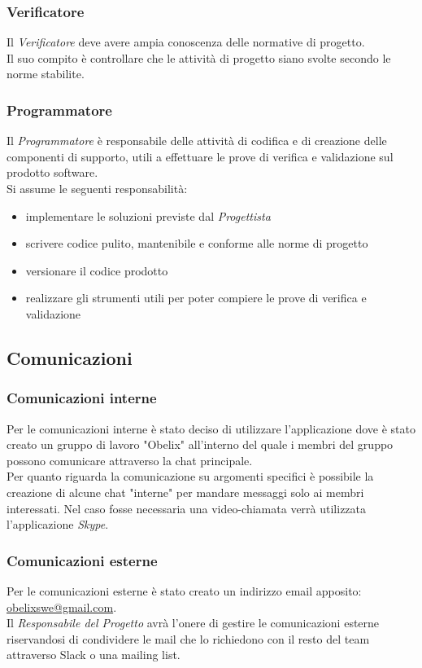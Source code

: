 \subsubsection{Verificatore}
Il  \emph{Verificatore}  deve avere ampia conoscenza delle normative di progetto.\\Il suo compito è controllare che le attività di progetto siano svolte secondo le norme stabilite.
\subsubsection{Programmatore}
Il  \emph{Programmatore}  è responsabile delle attività di codifica e di creazione delle componenti di supporto, utili a effettuare le prove di verifica e validazione sul prodotto software.\\
Si assume le seguenti responsabilità:
\begin{itemize}
	\item implementare le soluzioni previste dal  \emph{Progettista} 
	\item scrivere codice pulito, mantenibile  e conforme alle norme di progetto
	\item versionare il codice prodotto
	\item realizzare gli strumenti utili per poter compiere le prove di verifica e validazione
\end{itemize}

\subsection{Comunicazioni}
\subsubsection{Comunicazioni interne}
Per le comunicazioni interne è stato deciso di utilizzare
l'applicazione  dove è stato creato un gruppo di lavoro
"Obelix" all'interno del quale i membri del gruppo possono comunicare
attraverso la chat principale.\\ 
Per quanto riguarda la comunicazione su argomenti specifici è possibile la creazione di alcune chat "interne" per mandare messaggi solo ai membri interessati.
Nel caso fosse necessaria una video-chiamata verrà utilizzata l'applicazione \emph{Skype}.
\subsubsection{Comunicazioni esterne}
Per le comunicazioni esterne è stato creato un indirizzo email
apposito: \href{mailto:obelixswe@gmail.com}{obelixswe@gmail.com}.\\Il
\emph{ \emph{Responsabile}  del 
	Progetto} avrà l'onere di gestire le comunicazioni esterne
riservandosi di condividere le mail che lo richiedono con il resto del
team attraverso Slack o una mailing list. 


